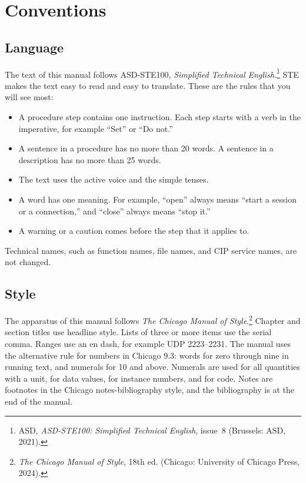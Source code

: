 \section*{Conventions}

\subsection*{Language}

The text of this manual follows ASD-STE100, \textit{Simplified Technical
English}.\footnote{ASD, \textit{ASD-STE100: Simplified Technical English},
issue~8 (Brussels: ASD, 2021).} STE makes the text easy to read and easy to
translate. These are the rules that you will see most:

\begin{itemize}
  \item A procedure step contains one instruction. Each step starts with a
        verb in the imperative, for example ``Set'' or ``Do not.''
  \item A sentence in a procedure has no more than 20 words. A sentence in
        a description has no more than 25 words.
  \item The text uses the active voice and the simple tenses.
  \item A word has one meaning. For example, ``open'' always means ``start
        a session or a connection,'' and ``close'' always means ``stop it.''
  \item A warning or a caution comes before the step that it applies to.
\end{itemize}

Technical names, such as function names, file names, and CIP service names,
are not changed.

\subsection*{Style}

The apparatus of this manual follows \textit{The Chicago Manual of
Style}.\footnote{\textit{The Chicago Manual of Style}, 18th ed. (Chicago:
University of Chicago Press, 2024).} Chapter and section titles use headline
style. Lists of three or more items use the serial comma. Ranges use an en
dash, for example UDP 2223--2231. The manual uses the alternative rule for
numbers in Chicago 9.3: words for zero through nine in running text, and
numerals for 10 and above. Numerals are used for all quantities with a unit,
for data values, for instance numbers, and for code. Notes are footnotes in
the Chicago notes-bibliography style, and the bibliography is at the end of
the manual.

